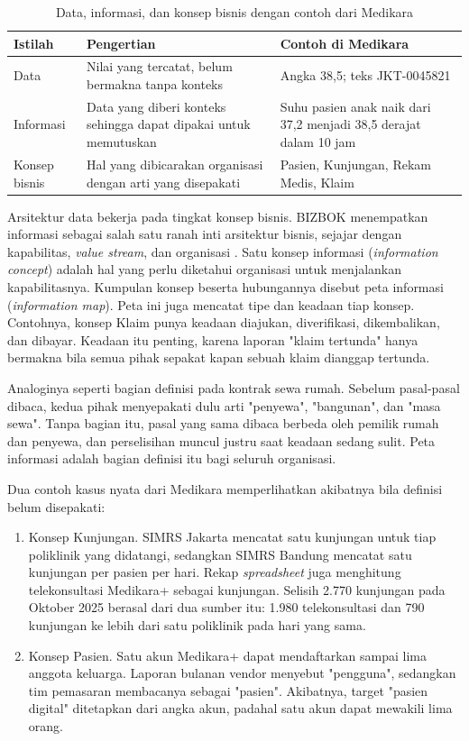 \begin{table}[!htb]
  \centering
  \caption{Data, informasi, dan konsep bisnis dengan contoh dari Medikara}
  \label{tab:ch06-data-informasi}
  \begin{tabularx}{\textwidth}{lXX}
    \hline
    \textbf{Istilah} & \textbf{Pengertian} & \textbf{Contoh di Medikara} \\
    \hline
    Data & Nilai yang tercatat, belum bermakna tanpa konteks & Angka 38,5; teks
      JKT-0045821 \\
    \hline
    Informasi & Data yang diberi konteks sehingga dapat dipakai untuk memutuskan &
      Suhu pasien anak naik dari 37,2 menjadi 38,5 derajat dalam 10 jam \\
    \hline
    Konsep bisnis & Hal yang dibicarakan organisasi dengan arti yang disepakati &
      Pasien, Kunjungan, Rekam Medis, Klaim \\
    \hline
  \end{tabularx}
\end{table}

Arsitektur data bekerja pada tingkat konsep bisnis. BIZBOK menempatkan
informasi sebagai salah satu ranah inti arsitektur bisnis, sejajar dengan
kapabilitas, \textit{value stream}, dan organisasi \cite{bizbok15}. Satu
konsep informasi (\textit{information concept}) adalah hal yang perlu diketahui
organisasi untuk menjalankan kapabilitasnya. Kumpulan konsep beserta
hubungannya disebut peta informasi (\textit{information map}). Peta ini juga
mencatat tipe dan keadaan tiap konsep. Contohnya, konsep Klaim punya keadaan
diajukan, diverifikasi, dikembalikan, dan dibayar. Keadaan itu penting, karena
laporan "klaim tertunda" hanya bermakna bila semua pihak sepakat kapan sebuah
klaim dianggap tertunda.

Analoginya seperti bagian definisi pada kontrak sewa rumah. Sebelum pasal-pasal
dibaca, kedua pihak menyepakati dulu arti "penyewa", "bangunan", dan "masa
sewa". Tanpa bagian itu, pasal yang sama dibaca berbeda oleh pemilik rumah dan
penyewa, dan perselisihan muncul justru saat keadaan sedang sulit. Peta
informasi adalah bagian definisi itu bagi seluruh organisasi.

Dua contoh kasus nyata dari Medikara memperlihatkan akibatnya bila definisi
belum disepakati:

\begin{enumerate}
  \item Konsep Kunjungan. SIMRS Jakarta mencatat satu kunjungan untuk tiap
        poliklinik yang didatangi, sedangkan SIMRS Bandung mencatat satu
        kunjungan per pasien per hari. Rekap \textit{spreadsheet} juga menghitung
        telekonsultasi Medikara+ sebagai kunjungan. Selisih 2.770 kunjungan pada
        Oktober 2025 berasal dari dua sumber itu: 1.980 telekonsultasi dan 790
        kunjungan ke lebih dari satu poliklinik pada hari yang sama.
  \item Konsep Pasien. Satu akun Medikara+ dapat mendaftarkan sampai lima
        anggota keluarga. Laporan bulanan vendor menyebut "pengguna", sedangkan
        tim pemasaran membacanya sebagai "pasien". Akibatnya, target "pasien
        digital" ditetapkan dari angka akun, padahal satu akun dapat mewakili
        lima orang.
\end{enumerate}

